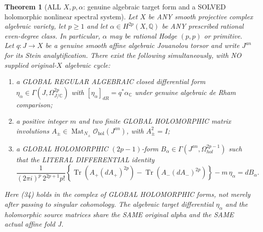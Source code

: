 \documentclass[11pt]{article}
\newtheorem{theorem}{Theorem}[section]
\begin{document}
\begin{theorem}[ALL $X,p,\alpha$: genuine algebraic target form and a SOLVED holomorphic nonlinear spectral system]
Let $X$ be ANY smooth projective complex algebraic variety,
let $p\ge1$ and let $\alpha\in H^{2p}(X,\mathbb Q)$ be
ANY prescribed rational even-degree class. In particular,
$\alpha$ may be rational Hodge $(p,p)$ or primitive.
Let $q:J\to X$ be a genuine smooth affine algebraic
Jouanolou torsor and write $J^{an}$ for its Stein analytification.
There exist the following simultaneously, with NO supplied
original-$X$ algebraic cycle:
\begin{enumerate}
\item a GLOBAL REGULAR ALGEBRAIC closed differential form
      $\eta_\alpha\in\Gamma(J,\Omega^{2p}_{J/\mathbb C})$
      with $[\eta_\alpha]_{dR}=q^*\alpha_{\mathbb C}$
      under genuine algebraic de Rham comparison;
\item a positive integer $m$ and two finite GLOBAL
      HOLOMORPHIC matrix involutions
      $A_\pm\in\operatorname{Mat}_{N_\pm}
                    \mathcal O_{\mathrm{hol}}(J^{an})$,
      with $A_\pm^2=I$;
\item a GLOBAL HOLOMORPHIC $(2p-1)$-form
      $B_\alpha\in\Gamma(J^{an},\Omega^{2p-1}_{hol})$
      such that the LITERAL DIFFERENTIAL identity
\[
\boxed{\displaystyle
 \frac{1}{(2\pi i)^p\,2^{2p+1}p!}
 \left\{\operatorname{Tr}(A_+(dA_+)^{2p})
       -\operatorname{Tr}(A_-(dA_-)^{2p})\right\}
       -m\,\eta_\alpha =dB_\alpha.}                       \tag{34}
\]
\end{enumerate}
Here (34) holds in the complex of GLOBAL HOLOMORPHIC forms,
not merely after passing to singular cohomology.
The algebraic target differential $\eta_\alpha$ and the
holomorphic source matrices share the SAME original
alpha and the SAME actual affine fold J.
\end{theorem}
\end{document}
